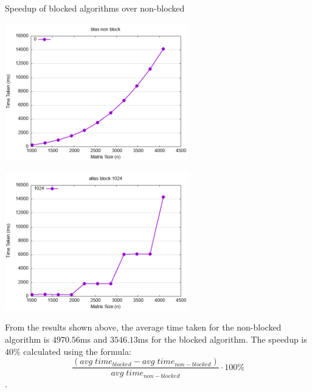 \documentclass[12pt]{article}
\begin{document}
\begin{section}{Speedup of blocked algorithms over non-blocked}
 \begin{center}
     \begin{minipage}{0.48\linewidth}
         \includegraphics*[width=8cm]{images/blas_non_block.png}
     \end{minipage}
     \begin{minipage}{0.48\linewidth}
         \includegraphics*[width=8cm]{images/atlas_block_1024.png}
     \end{minipage}
 \end{center}

 From the results shown above, the average time taken for the non-blocked algorithm is $4970.56$ms and $3546.13$ms for the blocked algorithm.
 The speedup is $40\%$ calculated using the formula: $$\frac{(avg\;time_{blocked} - avg\;time_{non-blocked})}{avg\;time_{non-blocked}} \cdot 100\%$$.
\end{section}
\end{document}
